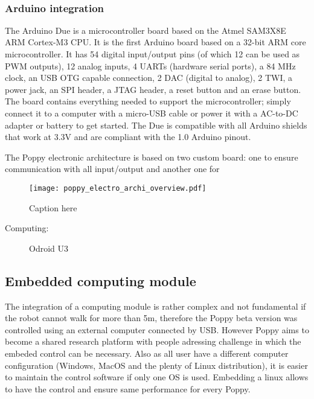 \begin{figure}[]
\centering
    \hfil
    \\
    \caption{}
    \label{fig:usb2ax}
\end{figure}

\subsubsection{Arduino integration} %
The Arduino Due is a microcontroller board based on the Atmel SAM3X8E ARM Cortex-M3 CPU. It is the first Arduino board based on a 32-bit ARM core microcontroller. It has 54 digital input/output pins (of which 12 can be used as PWM outputs), 12 analog inputs, 4 UARTs (hardware serial ports), a 84 MHz clock, an USB OTG capable connection, 2 DAC (digital to analog), 2 TWI, a power jack, an SPI header, a JTAG header, a reset button and an erase button.
The board contains everything needed to support the microcontroller; simply connect it to a computer with a micro-USB cable or power it with a AC-to-DC adapter or battery to get started. The Due is compatible with all Arduino shields that work at 3.3V and are compliant with the 1.0 Arduino pinout.

The Poppy electronic architecture is based on two custom board: one to ensure communication with all input/output and another one for

\begin{figure}[tb]
    \begin{center}
        \texttt{[image: poppy\_electro\_archi\_overview.pdf]}
    \end{center}
    \caption{Caption here}
    \label{fig:figure1}
\end{figure}

\begin{description}
    \item[Computing:] Odroid U3
\end{description}


\subsection{Embedded computing module} %

The integration of a computing module is rather complex and not fundamental if the robot cannot walk for more than 5m, therefore the Poppy beta version was controlled using an external computer connected by USB.
However Poppy aims to become a shared research platform with people adressing challenge in which the embeded control can be necessary. Also as all user have a different computer configuration (Windows, MacOS and the plenty of Linux distribution), it is easier to maintain the control software if only one OS is used. Embedding a linux allows to have the control and ensure same performance for every Poppy.

